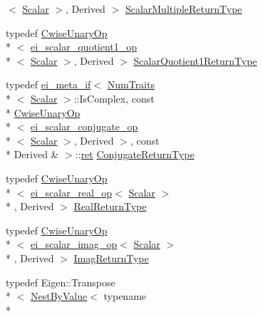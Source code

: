 \begin{DoxyCompactItemize}
$<$ \hyperlink{class_matrix_base_a625df8339dc2d816cbc0fd66e7dadaf5}{Scalar} $>$, Derived $>$ \hyperlink{class_matrix_base_a9230932303a92e0e58314d0daee8a9e6}{Scalar\-Multiple\-Return\-Type}
\item 
typedef \hyperlink{class_cwise_unary_op}{Cwise\-Unary\-Op}\\*
$<$ \hyperlink{structei__scalar__quotient1__op}{ei\-\_\-scalar\-\_\-quotient1\-\_\-op}\\*
$<$ \hyperlink{class_matrix_base_a625df8339dc2d816cbc0fd66e7dadaf5}{Scalar} $>$, Derived $>$ \hyperlink{class_matrix_base_aa82ce34efc5aad466c40b21933f59f94}{Scalar\-Quotient1\-Return\-Type}
\item 
typedef \hyperlink{structei__meta__if}{ei\-\_\-meta\-\_\-if}$<$ \hyperlink{struct_num_traits}{Num\-Traits}\\*
$<$ \hyperlink{class_matrix_base_a625df8339dc2d816cbc0fd66e7dadaf5}{Scalar} $>$\-::Is\-Complex, const \\*
\hyperlink{class_cwise_unary_op}{Cwise\-Unary\-Op}\\*
$<$ \hyperlink{structei__scalar__conjugate__op}{ei\-\_\-scalar\-\_\-conjugate\-\_\-op}\\*
$<$ \hyperlink{class_matrix_base_a625df8339dc2d816cbc0fd66e7dadaf5}{Scalar} $>$, Derived $>$, const \\*
Derived \& $>$\-::\hyperlink{group___i_p_conn_plugin_gabc99fe6afec1a75ccff1092e47375a40}{ret} \hyperlink{class_matrix_base_a91f43c00ced2c79a68df37e6251b0db5}{Conjugate\-Return\-Type}
\item 
typedef \hyperlink{class_cwise_unary_op}{Cwise\-Unary\-Op}\\*
$<$ \hyperlink{structei__scalar__real__op}{ei\-\_\-scalar\-\_\-real\-\_\-op}$<$ \hyperlink{class_matrix_base_a625df8339dc2d816cbc0fd66e7dadaf5}{Scalar} $>$\\*
, Derived $>$ \hyperlink{class_matrix_base_a02863bf8c3ddaf96fda6491811c3ec96}{Real\-Return\-Type}
\item 
typedef \hyperlink{class_cwise_unary_op}{Cwise\-Unary\-Op}\\*
$<$ \hyperlink{structei__scalar__imag__op}{ei\-\_\-scalar\-\_\-imag\-\_\-op}$<$ \hyperlink{class_matrix_base_a625df8339dc2d816cbc0fd66e7dadaf5}{Scalar} $>$\\*
, Derived $>$ \hyperlink{class_matrix_base_a68872f4e92191ab5c7d927329aa6d53c}{Imag\-Return\-Type}
\item 
typedef Eigen\-::\-Transpose\\*
$<$ \hyperlink{class_nest_by_value}{Nest\-By\-Value}$<$ typename \\*

\end{DoxyCompactItemize}
